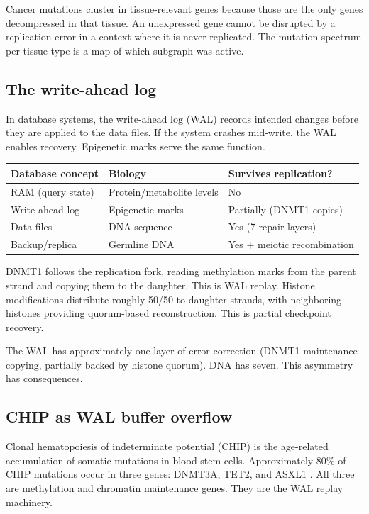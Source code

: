 \documentclass[11pt]{article}
\theoremstyle{definition}
\begin{document}
Cancer mutations cluster in tissue-relevant genes because those are
the only genes decompressed in that tissue. An unexpressed gene cannot
be disrupted by a replication error in a context where it is never
replicated. The mutation spectrum per tissue type is a map of which
subgraph was active.

\subsection{The write-ahead log}

In database systems, the write-ahead log (WAL) records intended
changes before they are applied to the data files. If the system
crashes mid-write, the WAL enables recovery. Epigenetic marks serve
the same function.

\begin{center}
\begin{tabular}{lll}
\toprule
\textbf{Database concept} & \textbf{Biology} & \textbf{Survives replication?} \\
\midrule
RAM (query state) & Protein/metabolite levels & No \\
Write-ahead log & Epigenetic marks & Partially (DNMT1 copies) \\
Data files & DNA sequence & Yes (7 repair layers) \\
Backup/replica & Germline DNA & Yes + meiotic recombination \\
\bottomrule
\end{tabular}
\end{center}

DNMT1 follows the replication fork, reading methylation marks from
the parent strand and copying them to the daughter. This is WAL replay.
Histone modifications distribute roughly 50/50 to daughter strands,
with neighboring histones providing quorum-based reconstruction. This
is partial checkpoint recovery.

The WAL has approximately one layer of error correction (DNMT1
maintenance copying, partially backed by histone quorum). DNA has
seven. This asymmetry has consequences.

\subsection{CHIP as WAL buffer overflow}

Clonal hematopoiesis of indeterminate potential (CHIP) is the
age-related accumulation of somatic mutations in blood stem cells.
Approximately 80\% of CHIP mutations occur in three genes: DNMT3A,
TET2, and ASXL1 \cite{Jaiswal2014}. All three are methylation and
chromatin maintenance genes. They are the WAL replay machinery.
\end{document}
